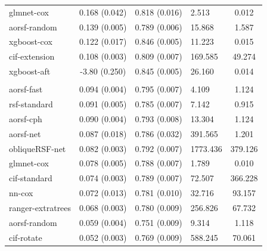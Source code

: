 \documentclass[twoside,11pt]{article}\usepackage[]{graphicx}\usepackage[]{xcolor}
\newenvironment{knitrout}{}{} %
\begin{document}
\begin{knitrout}
\begin{longtable}[t]{lcclc}
\hspace{1em}glmnet-cox & 0.168 (0.042) & 0.818 (0.016) & 2.513 & 0.012\\
\hspace{1em}aorsf-random & 0.139 (0.005) & 0.789 (0.006) & 15.868 & 1.587\\
\hspace{1em}xgboost-cox & 0.122 (0.017) & 0.846 (0.005) & 11.223 & 0.015\\
\hspace{1em}cif-extension & 0.108 (0.003) & 0.809 (0.007) & 169.585 & 49.274\\
\hspace{1em}xgboost-aft & -3.80 (0.250) & 0.845 (0.005) & 26.160 & 0.014\\
\addlinespace[0.3em]
\hline
\multicolumn{5}{l}{\textit{\textbf{ARIC; stroke, n = 13623, p = 41}}}\\
\hline
\hspace{1em}aorsf-fast & 0.094 (0.004) & 0.795 (0.007) & 4.109 & 1.124\\
\hspace{1em}rsf-standard & 0.091 (0.005) & 0.785 (0.007) & 7.142 & 0.915\\
\hspace{1em}aorsf-cph & 0.090 (0.004) & 0.793 (0.008) & 13.304 & 1.124\\
\hspace{1em}aorsf-net & 0.087 (0.018) & 0.786 (0.032) & 391.565 & 1.201\\
\hspace{1em}obliqueRSF-net & 0.082 (0.003) & 0.792 (0.007) & 1773.436 & 379.126\\
\hspace{1em}glmnet-cox & 0.078 (0.005) & 0.788 (0.007) & 1.789 & 0.010\\
\hspace{1em}cif-standard & 0.074 (0.003) & 0.789 (0.007) & 72.507 & 366.228\\
\hspace{1em}nn-cox & 0.072 (0.013) & 0.781 (0.010) & 32.716 & 93.157\\
\hspace{1em}ranger-extratrees & 0.068 (0.003) & 0.780 (0.009) & 256.826 & 67.732\\
\hspace{1em}aorsf-random & 0.059 (0.004) & 0.751 (0.009) & 9.314 & 1.118\\
\hspace{1em}cif-rotate & 0.052 (0.003) & 0.769 (0.009) & 588.245 & 70.061\\

\end{longtable}
\end{knitrout}
\end{document}
